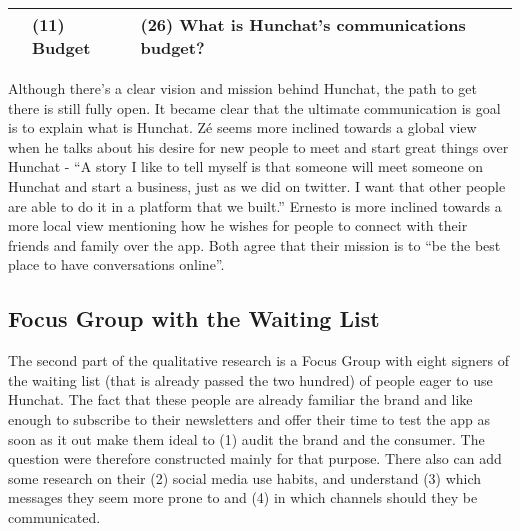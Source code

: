 \documentclass[11pt]{article}
\begin{document}
\begin{table}[htb]
\begin{tabular}{lll}
                            & (11) Budget            & (26) What is Hunchat's communications budget?                                                                                                                                                                                                                                                                                                                                                                                    \\ \hline
\end{tabular}
\end{table}

Although there's a clear vision and mission behind Hunchat, the path to get there is still fully open. It became clear that the ultimate communication is goal is to explain what is Hunchat. Zé seems more inclined towards a global view when he talks about his desire for new people to meet and start great things over Hunchat - “A story I like to tell myself is that someone will meet someone on Hunchat and start a business, just as we did on twitter. I want that other people are able to do it in a platform that we built.” Ernesto is more inclined towards a more local view mentioning how he wishes for people to connect with their friends and family over the app. Both agree that their mission is to “be the best place to have conversations online”.
\pagebreak
\subsection{Focus Group with the Waiting List}
The second part of the qualitative research is a Focus Group with eight signers of the waiting list (that is already passed the two hundred) of people eager to use Hunchat. The fact that these people are already familiar the brand and like enough to subscribe to their newsletters and offer their time to test the app as soon as it out make them ideal to (1) audit the brand and the consumer. The question were therefore constructed mainly for that purpose. There also can add some research on their (2) social media use habits, and understand (3) which messages they seem more prone to and (4) in which channels should they be communicated.
\end{document}
